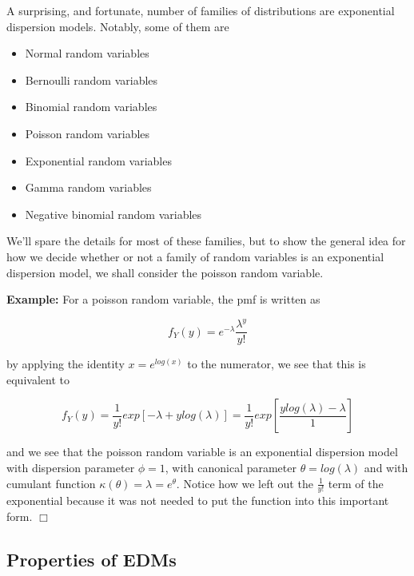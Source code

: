 \documentclass[
]{book}
\providecommand{\tightlist}{%
  \setlength{\itemsep}{0pt}\setlength{\parskip}{0pt}}
\begin{document}
A surprising, and fortunate, number of families of distributions are exponential dispersion models. Notably, some of them are

\begin{itemize}
\tightlist
\item
  Normal random variables
\item
  Bernoulli random variables
\item
  Binomial random variables
\item
  Poisson random variables
\item
  Exponential random variables
\item
  Gamma random variables
\item
  Negative binomial random variables
\end{itemize}

We'll spare the details for most of these families, but to show the general idea for how we decide whether or not a family of random variables is an exponential dispersion model, we shall consider the poisson random variable.

\textbf{Example:} For a poisson random variable, the pmf is written as

\[
f_Y(y) = e^{-\lambda}\frac{\lambda^y}{y!}
\]

by applying the identity \(x=e^{log(x)}\) to the numerator, we see that this is equivalent to

\[
f_Y(y) =\frac{1}{y!} exp\left[-\lambda + y log(\lambda) \right] 
= \frac{1}{y!} exp\left[\frac{y log(\lambda) -\lambda}{1} \right] 
\]

and we see that the poisson random variable is an exponential dispersion model with dispersion parameter \(\phi = 1\), with canonical parameter \(\theta = log(\lambda)\) and with cumulant function \(\kappa(\theta) = \lambda = e^\theta\). Notice how we left out the \(\frac{1}{y!}\) term of the exponential because it was not needed to put the function into this important form. \(\Box\)

\hypertarget{properties-of-edms}{%
\subsection{Properties of EDMs}\label{properties-of-edms}}
\end{document}
